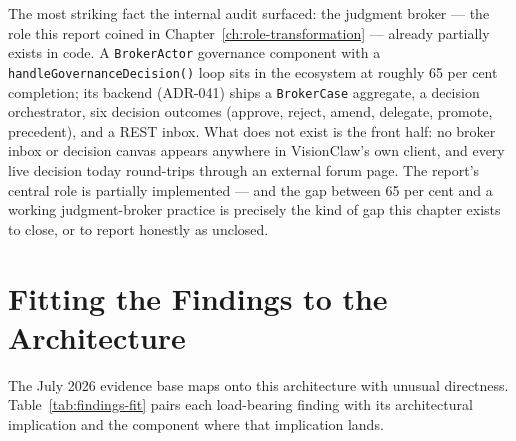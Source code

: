 \begin{keyinsight}[title={The Broker Is Already Half-Built}]
The most striking fact the internal audit surfaced: the judgment broker --- the role this report coined in Chapter~\ref{ch:role-transformation} --- already partially exists in code. A \texttt{BrokerActor} governance component with a \texttt{handleGovernanceDecision()} loop sits in the ecosystem at roughly 65 per cent completion; its backend (ADR-041) ships a \texttt{BrokerCase} aggregate, a decision orchestrator, six decision outcomes (approve, reject, amend, delegate, promote, precedent), and a REST inbox. What does not exist is the front half: no broker inbox or decision canvas appears anywhere in VisionClaw's own client, and every live decision today round-trips through an external forum page. The report's central role is partially implemented --- and the gap between 65 per cent and a working judgment-broker practice is precisely the kind of gap this chapter exists to close, or to report honestly as unclosed.
\end{keyinsight}

\section{Fitting the Findings to the Architecture}

The July 2026 evidence base maps onto this architecture with unusual directness. Table~\ref{tab:findings-fit} pairs each load-bearing finding with its architectural implication and the component where that implication lands.

